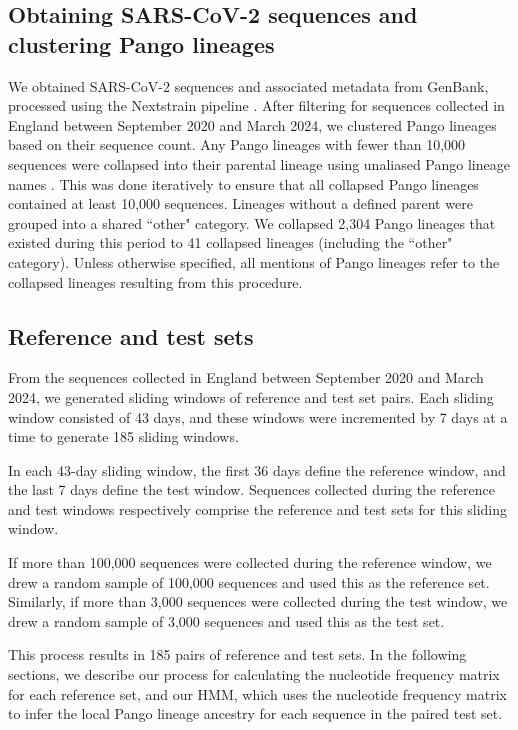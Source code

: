 \documentclass[11pt,oneside,letterpaper]{article}
\begin{document}
\subsection{Obtaining SARS-CoV-2 sequences and clustering Pango lineages}\label{subsec:data}

We obtained SARS-CoV-2 sequences and associated metadata from GenBank, processed using the Nextstrain pipeline \cite{hadfield_nextstrain_2018}. After filtering for sequences collected in England between September 2020 and March 2024, we clustered Pango lineages based on their sequence count. Any Pango lineages with fewer than 10,000 sequences were collapsed into their parental lineage using unaliased Pango lineage names \cite{otoole_assignment_2021}. This was done iteratively to ensure that all collapsed Pango lineages contained at least 10,000 sequences. 
Lineages without a defined parent were grouped into a shared ``other" category. We collapsed 2,304 Pango lineages that existed during this period to 41 collapsed lineages (including the ``other" category). Unless otherwise specified, all mentions of Pango lineages refer to the collapsed lineages resulting from this procedure. 

\subsection{Reference and test sets}\label{subsec:reference_set}

From the sequences collected in England between September 2020 and March 2024, we generated sliding windows of reference and test set pairs. Each sliding window consisted of 43 days, and these windows were incremented by 7 days at a time to generate 185 sliding windows.

In each 43-day sliding window, the first 36 days define the reference window, and the last 7 days define the test window. Sequences collected during the reference and test windows respectively comprise the reference and test sets for this sliding window. 

If more than 100,000 sequences were collected during the reference window, we drew a random sample of 100,000 sequences and used this as the reference set. Similarly, if more than 3,000 sequences were collected during the test window, we drew a random sample of 3,000 sequences and used this as the test set. 

This process results in 185 pairs of reference and test sets. In the following sections, we describe our process for calculating the nucleotide frequency matrix for each reference set, and our HMM, which uses the nucleotide frequency matrix to infer the local Pango lineage ancestry for each sequence in the paired test set. 
\end{document}
